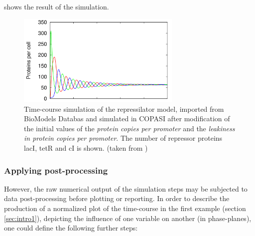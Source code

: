  shows the result of the simulation.
%
\begin{figure}
\centering
\includegraphics[width=0.7\textwidth]{images/simEx3.png}
\caption{Time-course simulation of the repressilator model, imported from BioModels Databas and simulated in COPASI after modification of the initial values of the \emph{protein copies per promoter} and the \emph{leakiness in protein copies per promoter}. The number of repressor proteins lacI, tetR and cI is shown. (taken from \cite{Waltemath:2010})}
\label{fig:simEx3}
\end{figure}


\subsubsection{Applying post-processing}
However, the raw numerical output of the simulation steps may be subjected to data post-processing before plotting or reporting.  In order to describe the production of a normalized plot of the time-course in the first example (section \ref{sec:intro1}), depicting the influence of one variable on another (in phase-planes), one could define the following further steps:

